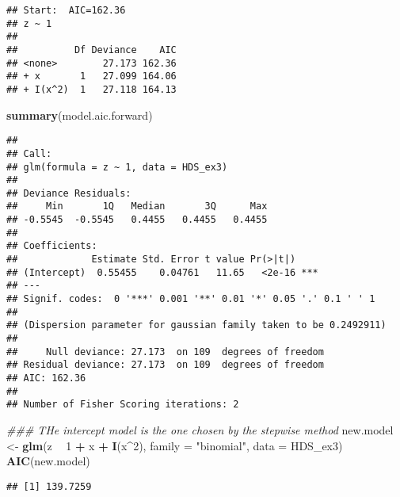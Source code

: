 \documentclass[]{article}
\newenvironment{Shaded}{\begin{snugshade}}{\end{snugshade}}
\newcommand{\CommentTok}[1]{\textcolor[rgb]{0.56,0.35,0.01}{\textit{#1}}}
\newcommand{\DataTypeTok}[1]{\textcolor[rgb]{0.13,0.29,0.53}{#1}}
\newcommand{\DecValTok}[1]{\textcolor[rgb]{0.00,0.00,0.81}{#1}}
\newcommand{\KeywordTok}[1]{\textcolor[rgb]{0.13,0.29,0.53}{\textbf{#1}}}
\newcommand{\NormalTok}[1]{#1}
\newcommand{\OperatorTok}[1]{\textcolor[rgb]{0.81,0.36,0.00}{\textbf{#1}}}
\newcommand{\StringTok}[1]{\textcolor[rgb]{0.31,0.60,0.02}{#1}}
\begin{document}
\begin{verbatim}
## Start:  AIC=162.36
## z ~ 1
## 
##          Df Deviance    AIC
## <none>        27.173 162.36
## + x       1   27.099 164.06
## + I(x^2)  1   27.118 164.13
\end{verbatim}

\begin{Shaded}
\begin{Highlighting}[]
\KeywordTok{summary}\NormalTok{(model.aic.forward)}
\end{Highlighting}
\end{Shaded}

\begin{verbatim}
## 
## Call:
## glm(formula = z ~ 1, data = HDS_ex3)
## 
## Deviance Residuals: 
##     Min       1Q   Median       3Q      Max  
## -0.5545  -0.5545   0.4455   0.4455   0.4455  
## 
## Coefficients:
##             Estimate Std. Error t value Pr(>|t|)    
## (Intercept)  0.55455    0.04761   11.65   <2e-16 ***
## ---
## Signif. codes:  0 '***' 0.001 '**' 0.01 '*' 0.05 '.' 0.1 ' ' 1
## 
## (Dispersion parameter for gaussian family taken to be 0.2492911)
## 
##     Null deviance: 27.173  on 109  degrees of freedom
## Residual deviance: 27.173  on 109  degrees of freedom
## AIC: 162.36
## 
## Number of Fisher Scoring iterations: 2
\end{verbatim}

\begin{Shaded}
\begin{Highlighting}[]
\CommentTok{### THe intercept model is the one chosen by the stepwise method}
\NormalTok{new.model <-}\StringTok{ }\KeywordTok{glm}\NormalTok{(z }\OperatorTok{~}\StringTok{ }\DecValTok{1} \OperatorTok{+}\StringTok{ }\NormalTok{x }\OperatorTok{+}\StringTok{ }\KeywordTok{I}\NormalTok{(x}\OperatorTok{^}\DecValTok{2}\NormalTok{), }\DataTypeTok{family =} \StringTok{"binomial"}\NormalTok{, }\DataTypeTok{data =}\NormalTok{ HDS_ex3)}
\KeywordTok{AIC}\NormalTok{(new.model)}
\end{Highlighting}
\end{Shaded}

\begin{verbatim}
## [1] 139.7259
\end{verbatim}
\end{document}
